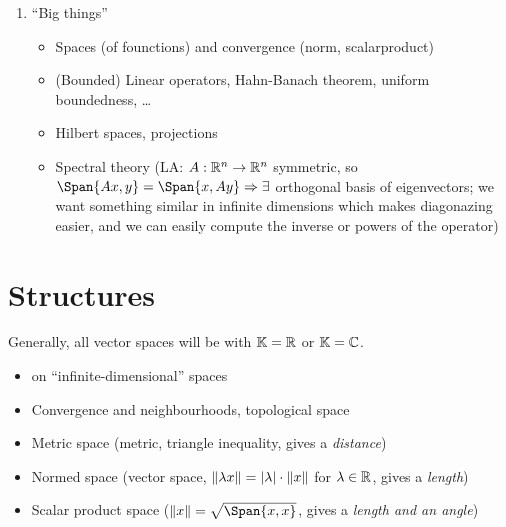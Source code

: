 \documentclass[language=english]{../../Template/TemplateLecture}
\begin{document}
\begin{enumerate}
\begin{itemize}
        \emph{Classical approach}: Given a potential $f \in C^2$, does there exist a solution and is that solution unique?

        \emph{Modern approach}: $\Delta: X \to Y$ linear map between function spaces. e.g. $X = C^2(U), Y = C^0(U)$. Existance of solutions for all $f \in C^0$ is equiv to surjectivity of $f\Delta$ and uniqueness is equivalent to injectivity.

        Fun fact: $C^2$ is a bad space for $\Delta$. But $\Delta$ is a good operator on many function spaces, e.g. $C^{2,\alpha}$ with $0 < \alpha < 1$, so $D^2 u$ is $\alpha$-Hölder continuous, or for $W^{2,p}$ as Sobolev spaces (where $D^2 u \in L^p$ for $1 < p < \infty$), where $D^2$ is the weak derivative
    \end{itemize}
    \item \enquote{Big things}
    \begin{itemize}
        \item Spaces (of founctions) and convergence (norm, scalarproduct)
        \item (Bounded) Linear operators, Hahn-Banach theorem, uniform boundedness, \ldots
        \item Hilbert spaces, projections
        \item Spectral theory (LA: $A: \mathbb{R}^n \to \mathbb{R}^n$ symmetric, so $\Span{Ax, y} = \Span{x, Ay} \Rightarrow \exists$ orthogonal basis of eigenvectors; we want something similar in infinite dimensions which makes diagonazing easier, and we can easily compute the inverse or powers of the operator)
    \end{itemize}
\end{enumerate}

\chapter{Structures}
Generally, all vector spaces will be with $\mathbb{K} = \mathbb{R}$ or $\mathbb{K} = \mathbb{C}$.
\begin{itemize}
    \item on \enquote{infinite-dimensional} spaces
    \item Convergence and neighbourhoods, topological space
    \item Metric space (metric, triangle inequality, gives a \emph{distance})
    \item Normed space (vector space, $\lVert\lambda x\rVert = \lvert\lambda\rvert \cdot \lVert x\rVert$ for $\lambda \in \mathbb{R}$, gives a \emph{length})
    \item Scalar product space ($\norm{x} = \sqrt{\Span{x,x}}$, gives a \emph{length and an angle}) 
\end{itemize}
\end{document}

